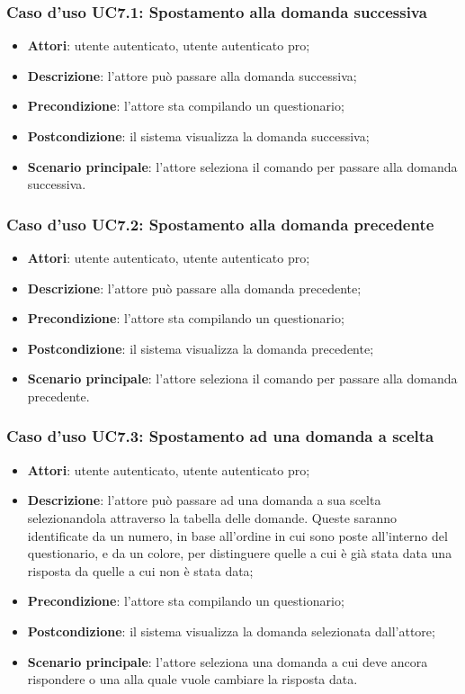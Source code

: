 \subsubsection{Caso d'uso UC7.1: Spostamento alla domanda successiva}
\label{UC7.1}
\begin{itemize}
\item\textbf{Attori}: utente autenticato, utente autenticato pro;
\item\textbf{Descrizione}: l'attore può passare alla domanda successiva;
\item\textbf{Precondizione}: l'attore sta compilando un questionario;
\item\textbf{Postcondizione}: il sistema visualizza la domanda successiva;
\item\textbf{Scenario principale}: l'attore seleziona il comando per passare alla domanda successiva.
\end{itemize}

\subsubsection{Caso d'uso UC7.2: Spostamento alla domanda precedente}
\label{UC7.2}
\begin{itemize}
\item\textbf{Attori}: utente autenticato, utente autenticato pro;
\item\textbf{Descrizione}: l'attore può passare alla domanda precedente;
\item\textbf{Precondizione}: l'attore sta compilando un questionario;
\item\textbf{Postcondizione}: il sistema visualizza la domanda precedente;
\item\textbf{Scenario principale}: l'attore seleziona il comando per passare alla domanda precedente.
\end{itemize}

\subsubsection{Caso d'uso UC7.3: Spostamento ad una domanda a scelta}
\label{UC7.3}
\begin{itemize}
\item\textbf{Attori}: utente autenticato, utente autenticato pro;
\item\textbf{Descrizione}: l'attore può passare ad una domanda a sua scelta selezionandola attraverso la tabella delle domande. Queste saranno identificate da un numero, in base all'ordine in cui sono poste all'interno del questionario, e da un colore, per distinguere quelle a cui è già stata data una risposta da quelle a cui non è stata data;
\item\textbf{Precondizione}: l'attore sta compilando un questionario;
\item\textbf{Postcondizione}: il sistema visualizza la domanda selezionata dall'attore;
\item\textbf{Scenario principale}: l'attore seleziona una domanda a cui deve ancora rispondere o una alla quale vuole cambiare la risposta data.
\end{itemize}

